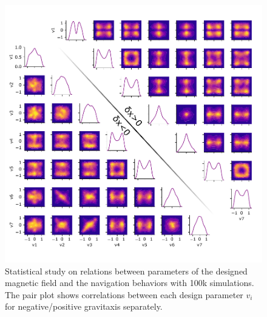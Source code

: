  
 \begin{figure}[p]
\centering
\includegraphics[width=16cm]{figures/5_4.pdf}
\caption{ Statistical study on relations between parameters of the designed magnetic field and the navigation behaviors with 100k simulations. The pair plot shows correlations between each design parameter $v_i$ for negative/positive gravitaxis separately.}
\label{fig:1}
\end{figure}
 
 
 
